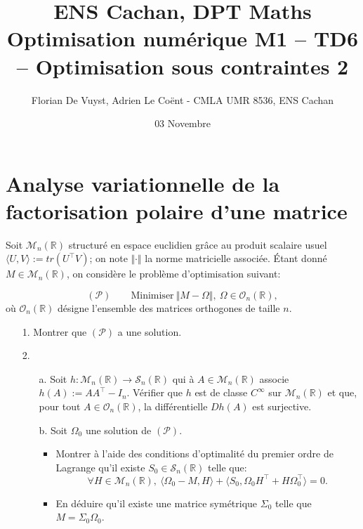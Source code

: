 \documentclass[11pt, a4paper]{article}
\title{ENS Cachan, DPT Maths \\ [1cm]
Optimisation numérique M1 -- TD6 -- Optimisation sous contraintes 2}
\author{Florian De Vuyst, Adrien Le Co\"ent - CMLA UMR 8536, ENS Cachan}
\date{03 Novembre}
\begin{document}
%
\maketitle
%
\section*{Analyse variationnelle de la factorisation polaire d'une matrice}
%
Soit $\mathcal{M}_n(\mathbb{R})$ structuré en espace euclidien grâce au produit 
scalaire usuel $ \langle U,V \rangle := tr(U^\top V)$; 
on note $\Vert \cdot \Vert$
la norme matricielle associée.
Étant donné $M \in \mathcal{M}_n(\mathbb{R})$, on considère le problème d'optimisation
suivant:

$$
  (\mathcal{P}) \quad \quad \text{Minimiser}~ \Vert M - \Omega \Vert, ~ \Omega \in \mathcal{O}_n(\mathbb{R}),
$$
où $\mathcal{O}_n(\mathbb{R})$ désigne l'ensemble des matrices orthogones de taille $n$.

\begin{itemize}
 \item[1.] Montrer que $(\mathcal{P})$ a une solution.
 \item[2.] \begin{itemize}
            \item[a.] Soit $h:\mathcal{M}_n(\mathbb{R}) \longrightarrow  \mathcal{S}_n(\mathbb{R})$ qui à 
            $A \in\mathcal{M}_n(\mathbb{R})$ associe $h(A) := A A ^\top - I_n$. Vérifier que $h$ est de 
            classe $C^\infty$ sur $\mathcal{M}_n(\mathbb{R})$ et que, pour tout $A \in \mathcal{O}_n(\mathbb{R})$,
la différentielle $Dh(A)$ est surjective.

	    \item[b.] Soit $\Omega_0$ une solution de $(\mathcal{P})$.
	    
	    \begin{itemize}
	     \item Montrer à l'aide des conditions d'optimalité du premier ordre de Lagrange qu'il existe
	     $S_0 \in \mathcal{S}_n(\mathbb{R})$ telle que:
	     $$ \forall H \in \mathcal{M}_n(\mathbb{R}),~ \langle \Omega_0 - M, H \rangle + \langle S_0, \Omega_0 H^\top + H \Omega_0^\top \rangle = 0. $$
	\item En déduire qu'il existe une matrice symétrique $\Sigma_0$ telle que $M = \Sigma_0 \Omega_0$.
	     \end{itemize}

           \end{itemize}

\end{itemize}
\end{document}
